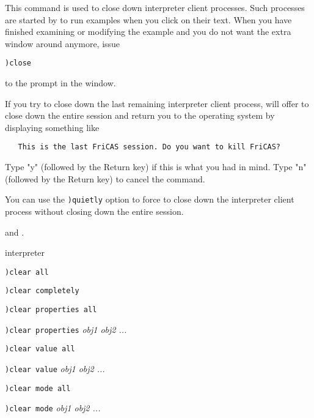 This command is used to close down interpreter client processes.
Such processes are started by \HyperName{} to run \Language{} examples
when you click on their text. When you have finished examining or modifying the
example and you do not want the extra window around anymore, issue
\begin{verbatim}
)close
\end{verbatim}
to the \Language{} prompt in the window.

If you try to close down the last remaining interpreter client
process, \Language{} will offer to close down the entire \Language{}
session and return you to the operating system by displaying something
like
\begin{verbatim}
   This is the last FriCAS session. Do you want to kill FriCAS?
\end{verbatim}
Type "y" (followed by the Return key) if this is what you had in mind.
Type "n" (followed by the Return key) to cancel the command.

You can use the {\tt )quietly} option to force \Language{} to
close down the interpreter client process without closing down
the entire \Language{} session.

\par{}
 and
.





\par{} interpreter

\par{}
\begin{simpleList}
\item{\tt )clear all}
\item{\tt )clear completely}
\item{\tt )clear properties all}
\item{\tt )clear properties}  {\it obj1 \lanb{}obj2 ...\ranb{}}
\item{\tt )clear value      all}
\item{\tt )clear value}     {\it obj1 \lanb{}obj2 ...\ranb{}}
\item{\tt )clear mode       all}
\item{\tt )clear mode}      {\it obj1 \lanb{}obj2 ...\ranb{}}
\end{simpleList}
\par{}


